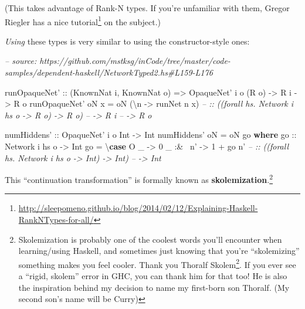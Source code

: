 \documentclass[]{article}
\newenvironment{Shaded}{}{}
\newcommand{\CommentTok}[1]{\textcolor[rgb]{0.38,0.63,0.69}{\textit{#1}}}
\newcommand{\DataTypeTok}[1]{\textcolor[rgb]{0.56,0.13,0.00}{#1}}
\newcommand{\DecValTok}[1]{\textcolor[rgb]{0.25,0.63,0.44}{#1}}
\newcommand{\FunctionTok}[1]{\textcolor[rgb]{0.02,0.16,0.49}{#1}}
\newcommand{\KeywordTok}[1]{\textcolor[rgb]{0.00,0.44,0.13}{\textbf{#1}}}
\newcommand{\NormalTok}[1]{#1}
\newcommand{\OtherTok}[1]{\textcolor[rgb]{0.00,0.44,0.13}{#1}}
\renewcommand{\href}[2]{#2\footnote{\url{#1}}}
\begin{document}
(This takes advantage of Rank-N types. If you're unfamiliar with them, Gregor
Riegler has a
\href{http://sleepomeno.github.io/blog/2014/02/12/Explaining-Haskell-RankNTypes-for-all/}{nice
tutorial} on the subject.)

\emph{Using} these types is very similar to using the constructor-style ones:

\begin{Shaded}
\begin{Highlighting}[]
\CommentTok{-- source: https://github.com/mstksg/inCode/tree/master/code-samples/dependent-haskell/NetworkTyped2.hs#L159-L176}

\OtherTok{runOpaqueNet' ::}\NormalTok{ (}\DataTypeTok{KnownNat}\NormalTok{ i, }\DataTypeTok{KnownNat}\NormalTok{ o)}
              \OtherTok{=>} \DataTypeTok{OpaqueNet'}\NormalTok{ i o (}\DataTypeTok{R}\NormalTok{ o)}
              \OtherTok{->} \DataTypeTok{R}\NormalTok{ i}
              \OtherTok{->} \DataTypeTok{R}\NormalTok{ o}
\NormalTok{runOpaqueNet' oN x }\FunctionTok{=}\NormalTok{ oN (\textbackslash{}n }\OtherTok{->}\NormalTok{ runNet n x)}
\CommentTok{--            :: ((forall hs. Network i hs o -> R o) -> R o)}
\CommentTok{--            -> R i}
\CommentTok{--            -> R o}

\OtherTok{numHiddens' ::} \DataTypeTok{OpaqueNet'}\NormalTok{ i o }\DataTypeTok{Int} \OtherTok{->} \DataTypeTok{Int}
\NormalTok{numHiddens' oN }\FunctionTok{=}\NormalTok{ oN go}
  \KeywordTok{where}
\OtherTok{    go ::} \DataTypeTok{Network}\NormalTok{ i hs o }\OtherTok{->} \DataTypeTok{Int}
\NormalTok{    go }\FunctionTok{=}\NormalTok{ \textbackslash{}}\KeywordTok{case}
        \DataTypeTok{O}\NormalTok{ _      }\OtherTok{->} \DecValTok{0}
\NormalTok{        _ }\FunctionTok{:&~}\NormalTok{ n' }\OtherTok{->} \DecValTok{1} \FunctionTok{+}\NormalTok{ go n'}
\CommentTok{--          :: ((forall hs. Network i hs o -> Int) -> Int)}
\CommentTok{--          -> Int}
\end{Highlighting}
\end{Shaded}

This ``continuation transformation'' is formally known as
\textbf{skolemization}.\footnote{Skolemization is probably one of the coolest
  words you'll encounter when learning/using Haskell, and sometimes just knowing
  that you're ``skolemizing'' something makes you feel cooler. Thank you
  \href{https://en.wikipedia.org/wiki/Thoralf_Skolem}{Thoralf Skolem}. If you
  ever see a ``rigid, skolem'' error in GHC, you can thank him for that too! He
  is also the inspiration behind my decision to name my first-born son Thoralf.
  (My second son's name will be Curry)}
\end{document}
